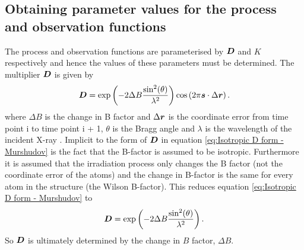 \subsection{Obtaining parameter values for the process and observation functions}
\label{sub:Obtaining parameter values for the process and observation functions}
The process and observation functions are parameterised by $\boldsymbol{D}$ and $K$ respectively and hence the values of these parameters must be determined.
The multiplier $\boldsymbol{D}$ is given by \cite{murshudov1997refinement,leal2012}
\begin{equation}
    \boldsymbol{D} = \exp \left( -2\Delta B \frac{\sin^2(\theta)}{\lambda^2} \right) \cos \left( 2 \pi \boldsymbol{s} \cdot \Delta \boldsymbol{r} \right).
    \label{eq:Isotropic D form - Murshudov}
\end{equation}
where $\Delta B$ is the change in B factor and $\Delta \boldsymbol{r}$ is the coordinate error from time point i to time point i + 1, $\theta$ is the Bragg angle and $\lambda$ is the wavelength of the incident X-ray .
Implicit to the form of $\boldsymbol{D}$ in equation \ref{eq:Isotropic D form - Murshudov} is the fact that the B-factor is assumed to be isotropic.
Furthermore it is assumed that the irradiation process only changes the B factor (not the coordinate error of the atoms) and the change in B-factor is the same for every atom in the structure (the Wilson B-factor).
This reduces equation \ref{eq:Isotropic D form - Murshudov} to
\begin{equation}
    \boldsymbol{D} = \exp \left( -2\Delta B \frac{\sin^2(\theta)}{\lambda^2} \right).
    \label{eq:Reduced D form}
\end{equation}
So $\boldsymbol{D}$ is ultimately determined by the change in $B$ factor, $\Delta B$.

